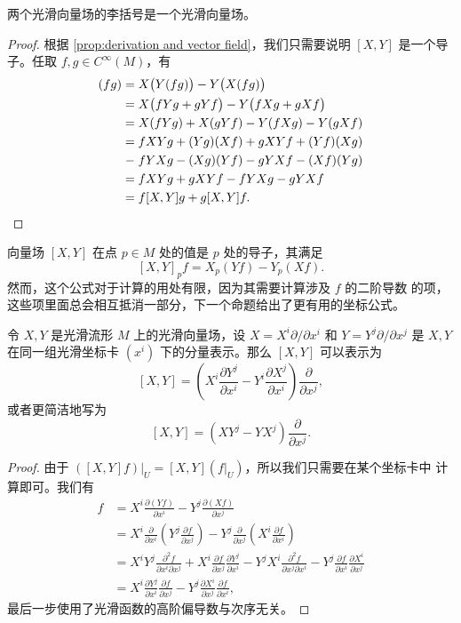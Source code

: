 \begin{lemma}
  两个光滑向量场的李括号是一个光滑向量场。
\end{lemma}
\begin{proof}
  \allowdisplaybreaks
  根据 \autoref{prop:derivation and vector field}，我们只需要说明
  $[X,Y]$ 是一个导子。任取 $f,g\in C^\infty(M)$，有
  \begin{align*}
    [X,Y](fg)&=X\bigl(Y(fg)\bigr)-Y\bigl(X(fg)\bigr)\\
    &=X\bigl(fYg+gYf\bigr)-Y\bigl(fXg+gXf\bigr)\\
    &=X(fYg)+X(gYf)-Y(fXg)-Y(gXf)\\
    &=fXYg+(Yg)(Xf)+gXYf+(Yf)(Xg)\\
    &\mathrel{-}fYXg-(Xg)(Yf)-gYXf-(Xf)(Yg)\\
    &=fXYg+gXYf-fYXg-gYXf\\
    &=f[X,Y]g+g[X,Y]f.\qedhere
  \end{align*}
\end{proof}

向量场 $[X,Y]$ 在点 $p\in M$ 处的值是 $p$ 处的导子，其满足
\[
  [X,Y]_pf=X_p(Yf)-Y_p(Xf).  
\]
然而，这个公式对于计算的用处有限，因为其需要计算涉及 $f$ 的二阶导数
的项，这些项里面总会相互抵消一部分，下一个命题给出了更有用的坐标公式。

\begin{proposition}[李括号的坐标公式]\label{prop:coordinate formula for lie bracket}
  令 $X,Y$ 是光滑流形 $M$ 上的光滑向量场，设 $X=X^i\partial/\partial x^i$
  和 $Y=Y^j\partial /\partial x^j$ 是 $X,Y$ 在同一组光滑坐标卡
  $(x^i)$ 下的分量表示。那么 $[X,Y]$ 可以表示为
  \[
    [X,Y]=\left(X^i\frac{\partial Y^j}{\partial x^i}-Y^i\frac{\partial X^j}{\partial x^i}\right)
    \frac{\partial}{\partial x^j},  
  \]
  或者更简洁地写为
  \[
    [X,Y]=\left(XY^j-YX^j\right)  \frac{\partial}{\partial x^j}.
  \]
\end{proposition}
\begin{proof}
  由于 $([X,Y]f)|_U=[X,Y](f|_U)$，所以我们只需要在某个坐标卡中
  计算即可。我们有
  \begin{align*}
    [X,Y]f&=X^i\frac{\partial (Yf)}{\partial x^i}-Y^j\frac{\partial (Xf)}{\partial x^j}\\
    &=X^i\frac{\partial}{\partial x^i}\left(Y^j\frac{\partial f}{\partial x^j}\right)
    -Y^j\frac{\partial}{\partial x^j}\left(X^i\frac{\partial f}{\partial x^i}\right)\\
    &=X^iY^j\frac{\partial^2f}{\partial x^i\partial x^j}
    +X^i\frac{\partial f}{\partial x^j}\frac{\partial Y^j}{\partial x^i}
    -Y^jX^i\frac{\partial^2 f}{\partial x^j\partial x^i}
    -Y^j\frac{\partial f}{\partial x^i}\frac{\partial X^i}{\partial x^j}\\
    &=X^i\frac{\partial Y^j}{\partial x^i}\frac{\partial f}{\partial x^j}-
    Y^j\frac{\partial X^i}{\partial x^j}\frac{\partial f}{\partial x^i},
  \end{align*}
  最后一步使用了光滑函数的高阶偏导数与次序无关。
\end{proof}

